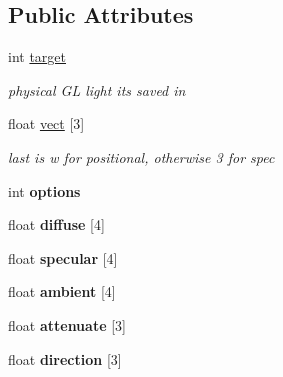 \subsection*{Public Attributes}
\begin{DoxyCompactItemize}
\item 
int \hyperlink{classGFXLight_a4ff967e8c7144289a11061d4dc218aaa}{target}\hypertarget{classGFXLight_a4ff967e8c7144289a11061d4dc218aaa}{}\label{classGFXLight_a4ff967e8c7144289a11061d4dc218aaa}

\begin{DoxyCompactList}\small\item\em physical GL light its saved in \end{DoxyCompactList}\item 
float \hyperlink{classGFXLight_a334e846aa90e15b6bf371f6fed258134}{vect} \mbox{[}3\mbox{]}\hypertarget{classGFXLight_a334e846aa90e15b6bf371f6fed258134}{}\label{classGFXLight_a334e846aa90e15b6bf371f6fed258134}

\begin{DoxyCompactList}\small\item\em last is w for positional, otherwise 3 for spec \end{DoxyCompactList}\item 
int {\bfseries options}\hypertarget{classGFXLight_ad91c4852eba52fbfb19e728823d52e8e}{}\label{classGFXLight_ad91c4852eba52fbfb19e728823d52e8e}

\item 
float {\bfseries diffuse} \mbox{[}4\mbox{]}\hypertarget{classGFXLight_a82e6da308249544633c4058c2c85bd05}{}\label{classGFXLight_a82e6da308249544633c4058c2c85bd05}

\item 
float {\bfseries specular} \mbox{[}4\mbox{]}\hypertarget{classGFXLight_aeee7c49491dd59cee202955548d75027}{}\label{classGFXLight_aeee7c49491dd59cee202955548d75027}

\item 
float {\bfseries ambient} \mbox{[}4\mbox{]}\hypertarget{classGFXLight_ac18426f44d69e865b4e7a44062926feb}{}\label{classGFXLight_ac18426f44d69e865b4e7a44062926feb}

\item 
float {\bfseries attenuate} \mbox{[}3\mbox{]}\hypertarget{classGFXLight_ae83bd33b1073616fd4c8ab499aad36f5}{}\label{classGFXLight_ae83bd33b1073616fd4c8ab499aad36f5}

\item 
float {\bfseries direction} \mbox{[}3\mbox{]}\hypertarget{classGFXLight_aced62f24b249c6ecac4bf99f14811b98}{}\label{classGFXLight_aced62f24b249c6ecac4bf99f14811b98}


\end{DoxyCompactItemize}
